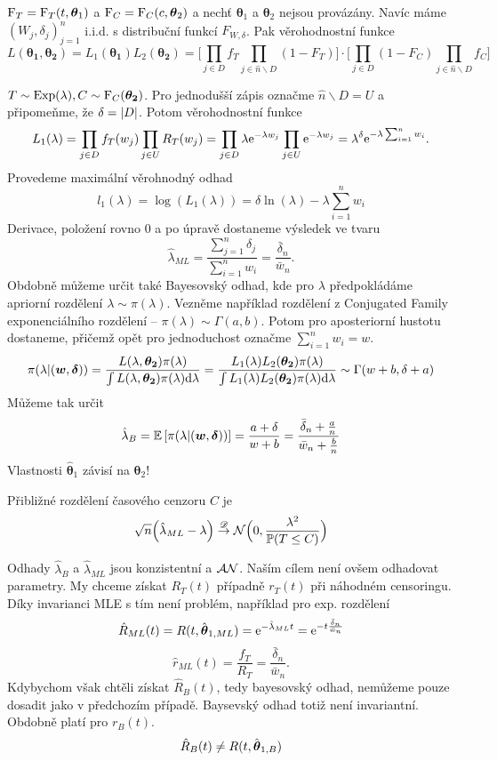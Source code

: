 \begin{dusl}
	$\mathrm{F}_T = \mathrm{F}_T(t,\boldsymbol{\theta}_1)$ a $\mathrm{F}_C = \mathrm{F}_C(c,\boldsymbol{\theta}_2)$ a nechť $\boldsymbol{\theta}_1$ a $\boldsymbol{\theta}_2$ nejsou provázány. Navíc máme $(W_j,\delta_j)_{j=1}^n$ i.i.d. s distribuční funkcí $F_{W,\delta}$. Pak věrohodnostní funkce
	$$L(\boldsymbol{\theta_1}, \boldsymbol{\theta_2}) = L_1(\boldsymbol{\theta_1})L_2(\boldsymbol{\theta_2}) = \Big[\prod_{j\in D }f_T\prod_{j \in \hat{n}\smallsetminus D}(1-F_T)\Big]\cdot\Big[\prod_{j\in D }(1-F_C)\prod_{j \in \hat{n}\smallsetminus D}f_C\Big]$$
\end{dusl}
\begin{example}
	$T \sim \mathrm{Exp}(\lambda), C\sim  \mathrm{F}_C(\boldsymbol{\theta_2})$. Pro jednodušší zápis označme $\hat{n}\smallsetminus D = U$ a připomeňme, že $\delta = \left|D\right|$.  Potom věrohodnostní funkce
	$$L_1(\lambda) =\prod_{j\in D }f_T(w_j)\prod_{j \in U}R_T(w_j) = \prod_{j\in D }\lambda\mathrm{e}^{-\lambda w_j}\prod_{j \in U}\mathrm{e}^{-\lambda w_j} = \lambda^{\delta}\mathrm{e}^{-\lambda\sum_{i=1}^n w_i}.$$ Provedeme maximální věrohnodný odhad
	$$l_1(\lambda) = \log(L_1(\lambda)) = \delta\ln(\lambda) - \lambda \sum_{i=1}^n w_i$$
	Derivace, položení rovno 0 a po úpravě dostaneme výsledek ve tvaru
	$$\hat{\lambda}_{ML} = \frac{\sum_{j=1}^n \delta_j}{\sum_{i=1}^n w_i} = \frac{\bar{\delta}_n}{\bar{w}_n}.$$
	Obdobně můžeme určit také Bayesovský odhad, kde pro $\lambda$ předpokládáme apriorní rozdělení $\lambda\sim \pi(\lambda)$. Vezněme například rozdělení z Conjugated Family exponenciálního rozdělení -- $\pi(\lambda) \sim \Gamma(a,b)$. Potom pro aposteriorní hustotu dostaneme, přičemž opět pro jednoduchost označme $\sum_{i=1}^n w_i  =w$.
	$$\pi(\lambda|(\boldsymbol{w},\boldsymbol{\delta})) = \frac{L(\lambda,\boldsymbol{\theta_2}) \pi(\lambda)}{\int L(\lambda,\boldsymbol{\theta_2}) \pi(\lambda)\mathrm{d} \lambda} = \frac{L_1(\lambda)L_2(\boldsymbol{\theta_2}) \pi(\lambda)}{\int L_1(\lambda)L_2(\boldsymbol{\theta_2}) \pi(\lambda)\mathrm{d} \lambda} \sim \Gamma(w+b,\delta+a)$$
	Můžeme tak určit
	$$\hat{\lambda}_{B} = \mathbb{E}\left[ \pi(\lambda|(\boldsymbol{w},\boldsymbol{\delta})) \right] = \frac{a+\delta}{w+b} = \frac{\bar{\delta}_n + \frac{a}{n}}{\bar{w}_n + \frac{b}{n}}$$
	Vlastnosti $\hat{\boldsymbol{\theta}}_1$ závisí na $\boldsymbol{\theta}_2$!
\end{example}
\begin{theorem}
	Přibližné rozdělení časového cenzoru $C$ je
	$$ \sqrt{n}\Big(\hat{\lambda}_{ML} - \lambda \Big) \stackrel{\mathscr{D}}{\to} \mathcal{N}\Big(0, \frac{\lambda^2}{\mathbb{P}(T \leq C)}\Big)$$
\end{theorem}
Odhady $\hat{\lambda}_{B}$ a $\hat{\lambda}_{ML}$ jsou konzistentní a $\mathcal{AN}$. Naším cílem není ovšem odhadovat parametry. My chceme získat $R_T(t)$ případně $r_T(t)$ při náhodném censoringu. Díky invarianci MLE s tím není problém, například pro exp. rozdělení
$$ \hat{R}_{ML}(t) = R(t, \hat{\boldsymbol{\theta}}_{1,ML}) = \mathrm{e}^{-\hat{\lambda}_{ML} t} = \mathrm{e}^{-t\frac{\bar{\delta}_n}{\bar{w}_n}}$$
$$ \hat{r}_{ML}(t) = \frac{f_T}{R_T} = \frac{\bar{\delta}_n}{\bar{w}_n}.$$
Kdybychom však chtěli získat $\hat{R}_{B}(t)$, tedy bayesovský odhad, nemůžeme pouze dosadit jako v předchozím případě. Baysevský odhad totiž není invariantní. Obdobně platí pro $r_B(t)$.
$$\hat{R}_{B}(t) \neq  R(t, \hat{\boldsymbol{\theta}}_{1,B})$$

